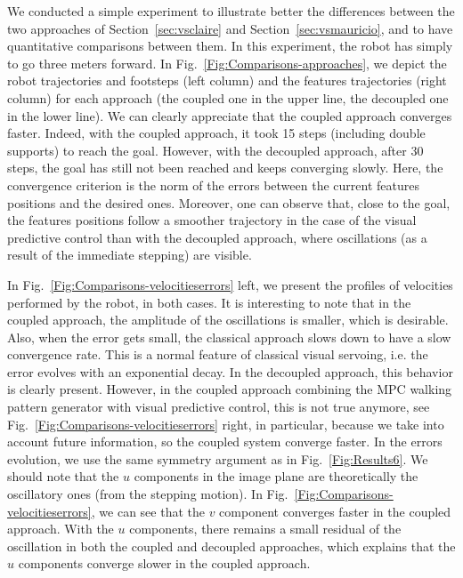 We conducted a simple experiment to illustrate better the differences between the two approaches of Section~\ref{sec:vsclaire} and Section~\ref{sec:vsmauricio}, and to have quantitative comparisons between them. In this experiment, the robot has simply to go three meters forward. In Fig.~\ref{Fig:Comparisons-approaches}, we depict the robot trajectories and footsteps (left column) and the features trajectories (right column) for each approach (the coupled one in the upper line, the decoupled one in the lower line). We can clearly appreciate that the coupled approach converges faster. Indeed, with the coupled approach, it took 15 steps (including double supports) to reach the goal. However, with the decoupled approach, after 30 steps, the goal  has still not been reached and keeps converging slowly. Here, the convergence criterion is the norm of the errors between the current features positions and the desired ones. Moreover, one can observe that, close to the goal, the features positions follow a smoother trajectory in the case of the visual predictive control than with the decoupled approach, where oscillations (as a result of the immediate stepping) are visible.

In Fig.~\ref{Fig:Comparisons-velocitieserrors} left, we present the profiles of velocities performed by the robot, in both cases. It is interesting to note that in the coupled approach, the amplitude of the oscillations is smaller, which is desirable. Also, when the error gets small, the classical approach slows down to have a slow convergence rate. This is a normal feature of classical visual servoing, i.e. the error evolves with an exponential decay. In the decoupled approach, this behavior is clearly present. However, in the coupled approach combining the MPC walking pattern generator with visual predictive control, this is not true anymore, see Fig.~\ref{Fig:Comparisons-velocitieserrors} right, in particular, because we take into account future information, so the coupled system converge faster. In the errors evolution, we use the same symmetry argument as in Fig.~\ref{Fig:Results6}. We should note that the $u$ components in the image plane are theoretically the oscillatory ones (from the stepping motion). In Fig.~\ref{Fig:Comparisons-velocitieserrors}, we can see that the $v$ component converges faster in the coupled approach. With the $u$ components, there remains a small residual of the oscillation in both the coupled and decoupled approaches, which explains that the $u$ components converge slower in the coupled approach.


